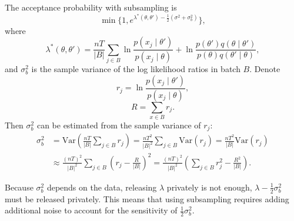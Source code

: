 \documentclass[english,twoside,openright]{HYgraduMLDS}
\newcommand{\var}{\mathrm{Var}}
\begin{document}
The acceptance probability with subsampling is
\[
    \min\{1, e^{\lambda^*(\theta, \theta') - \frac{1}{2}(\sigma^2 + \sigma_b^2)}\},
\]
where
\[
    \lambda^*(\theta, \theta') = \frac{nT}{|B|}\sum_{j\in B}
    \ln \frac{p(x_j\mid \theta')}{p(x_j \mid \theta)}
    + \ln \frac{p(\theta')q(\theta \mid \theta')}{p(\theta)q(\theta' \mid \theta)},
\]
and \(\sigma_b^2\) is the sample variance of the log likelihood ratios in 
batch \(B\). Denote
\[
    r_j = \ln \frac{p(x_j\mid \theta')}{p(x_j\mid \theta)},
\]
\[
    R = \sum_{x\in B}r_j.
\]
Then \(\sigma^2_b\) can be estimated from the sample variance of \(r_j\):
\begin{align*}
    \sigma_b^2 
    &= \var\left(\frac{nT}{|B|}\sum_{j\in B}r_j\right)
    = \frac{nT^2}{|B|^2}\sum_{j\in B}\var(r_j)
    = \frac{nT^2}{|B|}\var(r_j)
  \\&\approx\frac{(nT)^2}{|B|^2}
    \sum_{j\in B}\left(r_j - \frac{R}{|B|}\right)^2
    = \frac{(nT)^2}{|B|^2}\left(\sum_{j\in B}r_j^2 - \frac{R^2}{|B|}\right).
\end{align*}

Because \(\sigma_b^2\) depends on the data, releasing \(\lambda\) privately is 
not enough, \(\lambda - \frac{1}{2}\sigma_b^2\) must be released privately.
This means that using subsampling requires adding additional noise to account 
for the sensitivity of \(\frac{1}{2}\sigma_b^2\).
\end{document}
